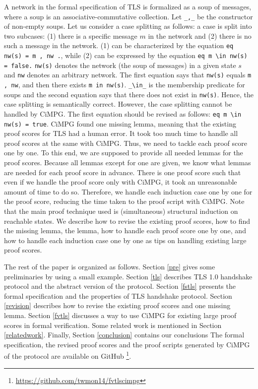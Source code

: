 \documentclass[a4paper,fleqn]{cas-dc}
\begin{document}
A network in the formal specification of TLS is formalized as a soup of messages, where a soup is an associative-commutative collection. Let \verb|_,_| be the constructor of non-empty soups. Let us consider a case splitting as follows: a case is split into two subcases: (1) there is a specific message $m$ in the network and (2) there is no such a message in the network. (1) can be characterized by the equation \verb!eq nw(s) = m , nw .!, while (2) can be expressed by the equation \verb!eq m \in nw(s) = false.! \verb!nw(s)! denotes the network (the soup of messages) in a given state $s$ and \verb!nw! denotes an arbitrary network. The first equation says that \verb!nw(s)! equals \verb!m , nw!, and then there exists \verb!m in nw(s)!. \verb|_\in_| is the membership predicate for soups and the second equation says that there does not exist in \verb!nw(s)!. Hence, the case splitting is semantically correct. However, the case splitting cannot be handled by CiMPG. The first equation should be revised as follows: 
\verb!eq m \in nw(s) = true!. CiMPG found one missing lemma, meaning that the existing proof scores for TLS had a human error. It took too much time to handle all proof scores at the same with CiMPG. Thus, we need to tackle each proof score one by one. To this end, we are supposed to provide all needed lemmas for the proof scores. Because all lemmas except for one are given, we know what lemmas are needed for each proof score in advance. There is one proof score such that even if we handle the proof score only with CiMPG, it took an unreasonable amount of time to do so. Therefore, we handle each induction case one by one for the proof score, reducing the time taken to the proof script with CiMPG. Note that the main proof technique used is (simultaneous) structural induction on reachable states. We describe how to revise the existing proof scores, how to find the missing lemma, the lemma, how to handle each proof score one by one, and how to handle each induction case one by one as tips on handling existing large proof scores.


The rest of the paper is organized as follows. Section \ref{pre} gives some preliminaries by using a small example. Section \ref{tls} describes TLS 1.0 handshake protocol and the abstract version of the protocol. Section \ref{fstls} presents the formal specification and the properties of TLS handshake protocol.
Section \ref{revision} describes how to revise the existing proof scores and one missing lemma. Section \ref{fvtls} discusses a way to use CiMPG for existing large proof scores in formal verification. Some related work is mentioned in Section \ref{relatedwork}. Finally, Section \ref{conclusion} contains our
conclusions 
The formal specification, the revised proof scores and the proof scripts generated by CiMPG of the protocol are available on GitHub \footnote{\url{https://github.com/twmon14/fvtlscimpg}}.
\end{document}

